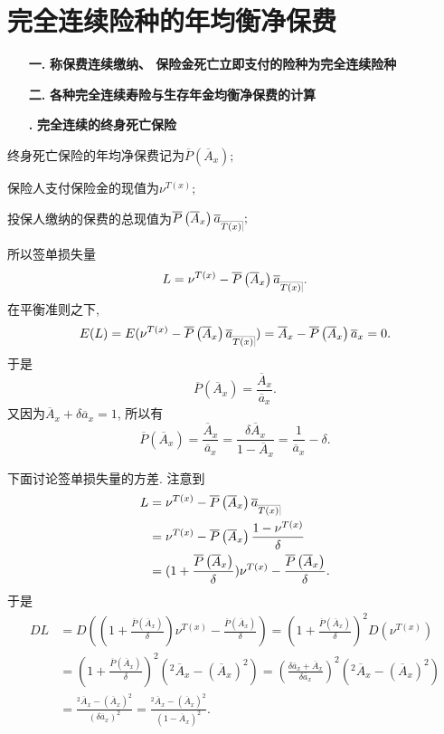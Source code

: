 \documentclass[a4paper,openany, 10pt]{ctexbook}
\makeatletter
\newcommand{\hei}{\CJKfamily{hei}}      %
\def\z{\left}
\def\y{\right}
\DeclareRobustCommand{\annu}[1]{_{%
    \def\arraystretch{0}%
    \setlength\arraycolsep{1pt}%
    \setlength\arrayrulewidth{.2pt}%
    \begin{array}[b]{@{}c|}\hline
        \\[\arraycolsep]%
        \scriptstyle #1%
    \end{array}%
}}
\makeatother
\begin{document}
\section{完全连续险种的年均衡净保费}
\begin{itemize}
    \item[{\bf\hei 一.}]{\bf\hei 称保费连续缴纳、 保险金死亡立即支付的险种为完全连续险种}
\end{itemize}
\begin{itemize}
    \item[{\bf\hei 二.}]{\bf\hei 各种完全连续寿险与生存年金均衡净保费的计算}
\end{itemize}
\begin{itemize}
  \item[{\bf\heiti 1.}] {\bf\heiti 完全连续的终身死亡保险}
\end{itemize}

\noindent 终身死亡保险的年均净保费记为$\overline{P}\left( \overline{A}_x \right);$

\noindent 保险人支付保险金的现值为$\nu^{T(x)};$

\noindent 投保人缴纳的保费的总现值为$\overline{P}\left( \overline{A}_x \right)\overline a_{\annu {T(x)}};$

\noindent 所以签单损失量$$L=\nu^{T(x)}-\overline{P}\left( \overline{A}_x \right)\overline a_{\annu {T(x)}}.$$
在平衡准则之下,
$$E(L)=E(\nu^{T(x)}-\overline{P}\left( \overline{A}_x \right)\overline a_{\annu {T(x)}})=\overline A_x-\overline{P}\left( \overline{A}_x \right)\overline a_{x}=0.$$
于是$$\overline{P}\left( \overline{A}_x \right)=\frac{\overline A_x}{\overline a_x}.$$
又因为$\overline A_x+\delta \overline a_x=1$, 所以有$$\overline{P}\left( \overline{A}_x \right)=\frac{\overline A_x}{\overline a_x}=\frac{\delta\overline A_x}{1-\overline A_x}=\frac{1}{\overline a_x}-\delta.$$

下面讨论签单损失量的方差. 注意到
\begin{align*}
  L&=\nu^{T(x)}-\overline{P}\left( \overline{A}_x \right)\overline a_{\annu {T(x)}}\\
  &=\nu^{T(x)}-\overline{P}\left( \overline{A}_x \right)\frac{1-\nu^{T(x)}}{\delta}\\
  &=(1+\frac{\overline{P}\left( \overline{A}_x \right)}{\delta})\nu^{T(x)}-\frac{\overline{P}\left( \overline{A}_x \right)}{\delta}.
\end{align*}
于是
\begin{align*}
    DL & =D\z((1+\frac{\overline{P}\left( \overline{A}_x \right)}{\delta})\nu^{T(x)}-\frac{\overline{P}\left( \overline{A}_x \right)}{\delta}\y)
    =\z(1+\frac{\overline{P}\left( \overline{A}_x \right)}{\delta}\y)^2D(\nu^{T(x)}) \\
        & =\z(1+\frac{\overline{P}\left( \overline{A}_x \right)}{\delta}\y)^2 \z({}^2\overline A_x-(\overline A_x)^2\y)=\z(\frac{\delta\overline a_x+\overline A_x}{\delta \overline a_x}\y)^2 \z({}^2\overline A_x-(\overline A_x)^2\y)\\
        &=\frac{^2\overline A_x-(\overline A_x)^2}{(\delta\overline a_x)^2}=\frac{^2\overline A_x-(\overline A_x)^2}{(1-\overline A_x)^2}.\\
\end{align*}
\end{document}
